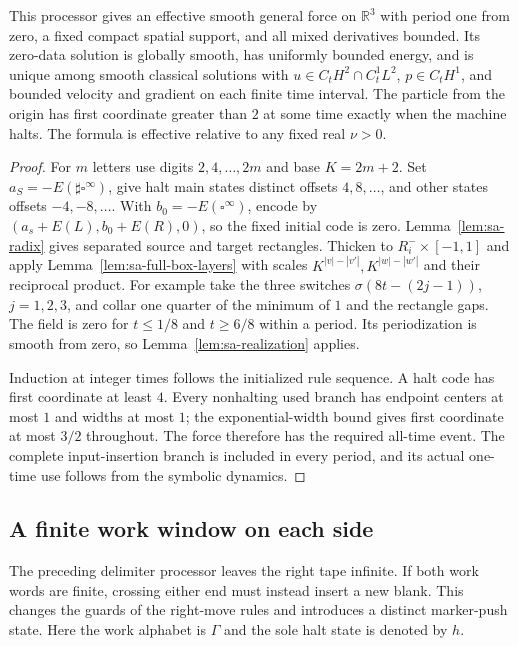 \begin{theorem}
\label{thm:sa-prefix-insertion}
This processor gives an effective smooth general force on $\mathbb R^3$
with period one from zero, a fixed compact spatial support, and all mixed
derivatives bounded.  Its zero-data solution is globally smooth, has
uniformly bounded energy, and is unique among smooth classical solutions
with $u\in C_tH^2\cap C_t^1L^2$, $p\in C_tH^1$, and bounded velocity
and gradient on each finite time interval.  The particle from the origin has
first coordinate greater than $2$ at some time exactly when the machine
halts.  The formula is effective relative to any fixed real $\nu>0$.
\end{theorem}
\begin{proof}
For $m$ letters use digits $2,4,\ldots,2m$ and base $K=2m+2$.
Set $a_S=-E(\sharp\square^\infty)$, give halt main states distinct
offsets $4,8,\ldots$, and other states offsets $-4,-8,\ldots$.
With $b_0=-E(\square^\infty)$, encode by
$(a_s+E(L),b_0+E(R),0)$, so the fixed initial code is zero.
Lemma~\ref{lem:sa-radix} gives separated source and target rectangles.
Thicken to $R_i^-\times[-1,1]$ and apply
Lemma~\ref{lem:sa-full-box-layers} with scales
$K^{|v|-|v'|},K^{|w|-|w'|}$ and their reciprocal product.
For example take the three switches $\sigma(8t-(2j-1))$, $j=1,2,3$,
and collar one quarter of the minimum of $1$ and the rectangle gaps.
The field is zero for $t\le1/8$ and $t\ge6/8$ within a period.
Its periodization is smooth from zero, so
Lemma~\ref{lem:sa-realization} applies.

Induction at integer times follows the initialized rule sequence.
A halt code has first coordinate at least $4$.  Every nonhalting used
branch has endpoint centers at most $1$ and widths at most $1$;
the exponential-width bound gives first coordinate at most $3/2$
throughout.  The force therefore has the required all-time event.
The complete input-insertion branch is included in every period, and
its actual one-time use follows from the symbolic dynamics.
\end{proof}

\subsection{A finite work window on each side}\label{subsec:sa-delimiter-history}
The preceding delimiter processor leaves the right tape infinite.  If both
work words are finite, crossing either end must instead insert a new blank.
This changes the guards of the right-move rules and introduces a distinct
marker-push state.  Here the work alphabet is $\Gamma$ and the sole halt
state is denoted by $h$.

